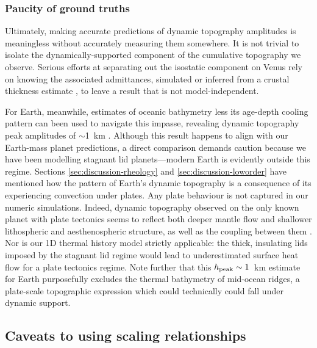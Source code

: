 

\subsubsection{Paucity of ground truths}\label{sec:benchmarks}

Ultimately, making accurate predictions of dynamic topography amplitudes is meaningless without accurately measuring them somewhere. It is not trivial to isolate the dynamically-supported component of the cumulative topography we observe. Serious efforts at separating out the isostatic component on Venus rely on knowing the associated admittances, simulated or inferred from a crustal thickness estimate \citep{mckenzie_relationship_1994, pauer_modeling_2006, wei_gravity_2014, yang_separation_2016}, to leave a result that is not model-independent. 

For Earth, meanwhile, estimates of oceanic bathymetry less its age-depth cooling pattern can been used to navigate this impasse, revealing dynamic topography peak amplitudes of $\sim$1~km \citep{hoggard_global_2016, hoggard_oceanic_2017}. Although this result happens to align with our Earth-mass planet predictions, a direct comparison demands caution because we have been modelling stagnant lid planets---modern Earth is evidently outside this regime. Sections \ref{sec:discussion-rheology} and \ref{sec:discussion-loworder} have mentioned how the pattern of Earth's dynamic topography is a consequence of its experiencing convection under plates. Any plate behaviour is not captured in our numeric simulations. Indeed, dynamic topography observed on the only known planet with plate tectonics seems to reflect both deeper mantle flow and shallower lithospheric and aesthenospheric structure, as well as the coupling between them \citep{davies_earth_2019}. Nor is our 1D thermal history model strictly applicable: the thick, insulating lids imposed by the stagnant lid regime would lead to underestimated surface heat flow for a plate tectonics regime. Note further that this $h_{\rm peak}\sim1$~km estimate for Earth purposefully excludes the thermal bathymetry of mid-ocean ridges, a plate-scale topographic expression which could technically could fall under dynamic support.



\subsection{Caveats to using scaling relationships}


